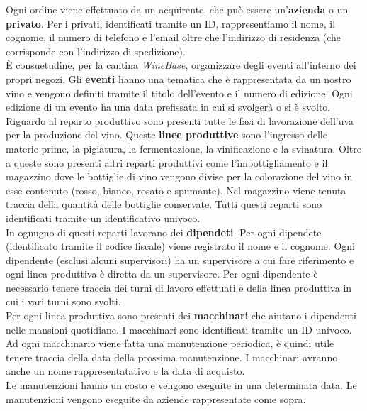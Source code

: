Ogni ordine viene effettuato da un acquirente, che può essere un'\textbf{azienda} o un \textbf{privato}. Per i privati, identificati tramite un ID, rappresentiamo il nome, il cognome, il numero di telefono e l'email oltre che l'indirizzo di residenza (che corrisponde con l'indirizzo di spedizione).\\
È consuetudine, per la cantina \emph{WineBase}, organizzare degli eventi all'interno dei propri negozi. Gli \textbf{eventi} hanno una tematica che è rappresentata da un nostro vino e vengono definiti tramite il titolo dell'evento e il numero di edizione. Ogni edizione di un evento ha una data prefissata in cui si svolgerà o si è svolto.
Riguardo al reparto produttivo sono presenti tutte le fasi di lavorazione dell'uva per la produzione del vino. Queste \textbf{linee produttive} sono l'ingresso delle materie prime, la pigiatura, la fermentazione, la vinificazione e la svinatura. Oltre a queste sono presenti altri reparti produttivi come l'imbottigliamento e il magazzino dove le bottiglie di vino vengono divise per la colorazione del vino in esse contenuto (rosso, bianco, rosato e spumante). Nel magazzino viene tenuta traccia della quantità delle bottiglie conservate. Tutti questi reparti sono identificati tramite un identificativo univoco.\\
In ognugno di questi reparti lavorano dei \textbf{dipendeti}. Per ogni dipendete (identificato tramite il codice fiscale) viene registrato il nome e il cognome. Ogni dipendente (esclusi alcuni supervisori) ha un supervisore a cui fare riferimento e ogni linea produttiva è diretta da un supervisore. Per ogni dipendente è necessario tenere traccia dei turni di lavoro effettuati e della linea produttiva in cui i vari turni sono svolti.\\
Per ogni linea produttiva sono presenti dei \textbf{macchinari} che aiutano i dipendenti nelle mansioni quotidiane. I macchinari sono identificati tramite un ID univoco. Ad ogni macchinario viene fatta una manutenzione periodica, è quindi utile tenere traccia della data della prossima manutenzione. I macchinari avranno anche un nome rappresentatativo e la data di acquisto.\\
Le manutenzioni hanno un costo e vengono eseguite in una determinata data. Le manutenzioni vengono eseguite da aziende rappresentate come sopra.